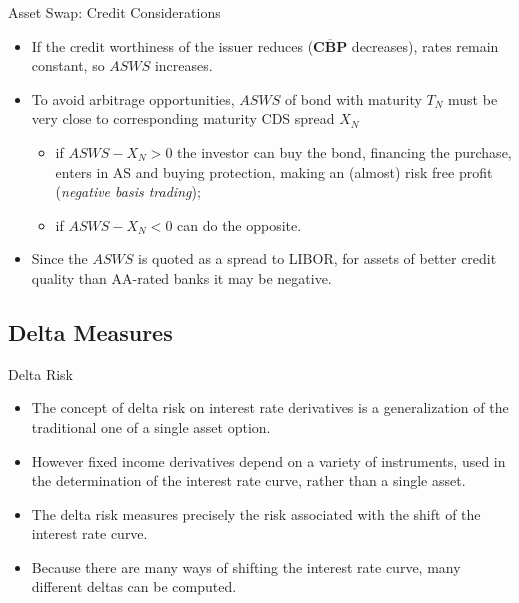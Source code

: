 \documentclass{beamer}
\begin{document}
\begin{frame}{Asset Swap: Credit Considerations}
	\begin{itemize}
		\item If the credit worthiness of the issuer reduces ($\overline{\textbf{CBP}}$ decreases), rates remain constant, so $ASWS$ increases.
		\item To avoid arbitrage opportunities, $ASWS$ of bond with maturity $T_N$ must be very close to corresponding maturity CDS spread $X_N$
		\begin{itemize}
			\item if $ASWS - X_N > 0$ the investor can buy the bond, financing the purchase, enters in AS and buying protection, making an (almost) risk free profit (\emph{negative basis trading});
			\item if $ASWS - X_N < 0$ can do the opposite.
		\end{itemize}
		\item Since the $ASWS$ is quoted as a spread to LIBOR, for assets of better credit quality than AA-rated banks it may be negative.
	\end{itemize}
\end{frame}

\subsection{Delta Measures}

\begin{frame}{Delta Risk}
	\begin{itemize}
	\item The concept of delta risk on interest rate derivatives is a generalization of the traditional one of a single asset option. 
	\item However fixed income derivatives depend on a variety of
	instruments, used in the determination of the interest rate curve, rather than a single asset.
	\item The delta risk measures precisely the risk associated with the
	shift of the interest rate curve. 
	\item Because there are many ways of shifting the interest rate curve, many different deltas can be computed. 
	\end{itemize}
\end{frame}
\end{document}
